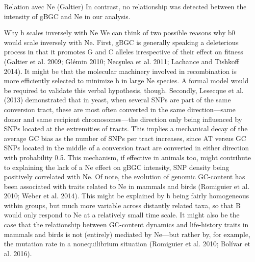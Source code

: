 Relation avec Ne (Galtier)
In contrast, no relationship was detected between the intensity of gBGC and Ne in our analysis. 


Why b scales inversely with Ne
We can think of two possible reasons why b0 would scale inversely with Ne. First, gBGC is generally speaking a deleterious process in that it promotes G and C alleles irrespective of their effect on fitness (Galtier et al. 2009; Glémin 2010; Necşulea et al. 2011; Lachance and Tishkoff 2014). It might be that the molecular machinery involved in recombination is more efficiently selected to minimize b in large Ne species. A formal model would be required to validate this verbal hypothesis, though. Secondly, Lesecque et al. (2013) demonstrated that in yeast, when several SNPs are part of the same conversion tract, these are most often converted in the same direction—same donor and same recipient chromosomes—the direction only being influenced by SNPs located at the extremities of tracts. This implies a mechanical decay of the average GC bias as the number of SNPs per tract increases, since AT versus GC SNPs located in the middle of a conversion tract are converted in either direction with probability 0.5. This mechanism, if effective in animals too, might contribute to explaining the lack of a Ne effect on gBGC intensity, SNP density being positively correlated with Ne. Of note, the evolution of genomic GC-content has been associated with traits related to Ne in mammals and birds (Romiguier et al. 2010; Weber et al. 2014). This might be explained by b being fairly homogeneous within groups, but much more variable across distantly related taxa, so that B would only respond to Ne at a relatively small time scale. It might also be the case that the relationship between GC-content dynamics and life-history traits in mammals and birds is not (entirely) mediated by Ne—but rather by, for example, the mutation rate in a nonequilibrium situation (Romiguier et al. 2010; Bolívar et al. 2016).






